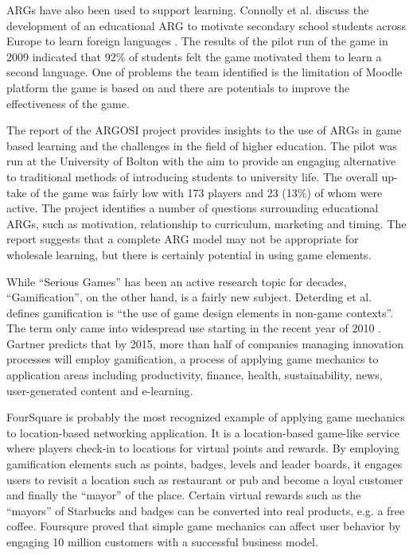 ARGs have also been used to support learning. Connolly et al. \cite{connolly2009arguing} discuss the development of an educational ARG to motivate secondary school students across Europe to learn foreign languages . The results of the pilot run of the game in 2009 indicated that 92\% of students felt the game motivated them to learn a second language. One of problems the team identified is the limitation of Moodle platform the game is based on and there are potentials to improve the effectiveness of the game.

The report of the ARGOSI project \cite{whitton2009alternate} provides insights to the use of ARGs in game based learning and the challenges in the field of higher education. The pilot was run at the University of Bolton with the aim to provide an engaging alternative to traditional methods of introducing students to university life. The overall up-take of the game was fairly low with 173 players and 23 (13\%) of whom were active. The project identifies a number of questions surrounding educational ARGs, such as motivation, relationship to curriculum, marketing and timing. The report
suggests that a complete ARG model may not be appropriate for wholesale learning, but there is certainly potential in using game elements.

While ``Serious Games'' has been an active research topic for decades, ``Gamification'', on the other hand, is a fairly new subject. Deterding et al. \cite {Deterding2011mt} defines gamification is ``the use of game design elements in non-game contexts''. The term only came into widespread use starting in the recent year of 2010 \cite {schell2010design}. Gartner \cite {gartnerPress2011} predicts that by 2015, more than half of companies managing innovation processes will employ gamification, a process of applying game mechanics to application areas including productivity, finance, health, sustainability, news, user-generated content and e-learning. 

FourSquare \cite{foursquare} is probably the most recognized example of applying game mechanics to location-based networking application. It is a location-based game-like service where players check-in to locations for virtual points and rewards.  By employing gamification elements such as points, badges, levels and leader boards, it engages users to revisit a location such as restaurant or pub and become a loyal customer and finally the ``mayor'' of the place. Certain virtual rewards such as the ``mayors'' of Starbucks and badges can be converted into real products, e.g. a free coffee. Foursqure proved that simple game mechanics can affect user behavior by engaging 10 million customers with a successful business model.


